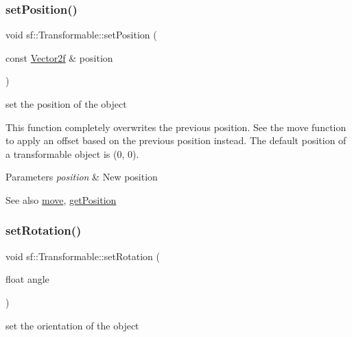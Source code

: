 \subsubsection{\texorpdfstring{setPosition()}{setPosition()}\hspace{0.1cm}{\footnotesize\ttfamily [2/2]}}
{\footnotesize\ttfamily void sf\+::\+Transformable\+::set\+Position (\begin{DoxyParamCaption}\item[{const \mbox{\hyperlink{classsf_1_1_vector2}{Vector2f}} \&}]{position }\end{DoxyParamCaption})}



set the position of the object 

This function completely overwrites the previous position. See the move function to apply an offset based on the previous position instead. The default position of a transformable object is (0, 0).


\begin{DoxyParams}{Parameters}
{\em position} & New position\\
\hline
\end{DoxyParams}
\begin{DoxySeeAlso}{See also}
\mbox{\hyperlink{classsf_1_1_transformable_a86b461d6a941ad390c2ad8b6a4a20391}{move}}, \mbox{\hyperlink{classsf_1_1_transformable_a73f9739bc6e74db2cea154bc8e94ec46}{get\+Position}} \begin{DoxyVerb}\end{DoxyVerb}
 
\end{DoxySeeAlso}
\mbox{\label{classsf_1_1_transformable_a32baf2bf1a74699b03bf8c95030a38ed}} 
\subsubsection{\texorpdfstring{setRotation()}{setRotation()}}
{\footnotesize\ttfamily void sf\+::\+Transformable\+::set\+Rotation (\begin{DoxyParamCaption}\item[{float}]{angle }\end{DoxyParamCaption})}



set the orientation of the object 

